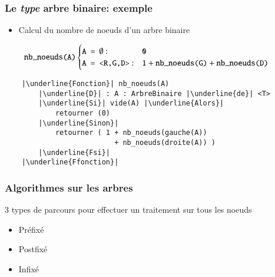 \documentclass[table,handout,tikz,12pt,svgnames]{beamer}
\begin{document}
\begin{frame}[fragile=singleslide]
	\frametitle{Le \textit{type} arbre binaire: exemple}
	\begin{block}{} %
		\begin{itemize}
			\item Calcul du nombre de noeuds d'un arbre binaire
		\end{itemize}
	\end{block}

	\begin{block}{}%
		\vspace{-1.5em}
		\small
		\[
		\hspace{-0.5cm}
		\texttt{nb\_noeuds(A)}
		\begin{cases}
		\texttt{A = $\emptyset$}: & \texttt{0}\\
		\texttt{A = <R,G,D>}: & \texttt{1} + \texttt{nb\_noeuds(G)} + \texttt{nb\_noeuds(D)}

		\end{cases}
		\]
		\vspace{-1em}
	\end{block}

	\begin{block}{}
		\begin{verbatim}
	|\underline{Fonction}| nb_noeuds(A)
		|\underline{D}| : A : ArbreBinaire |\underline{de}| <T>
		|\underline{Si}| vide(A) |\underline{Alors}|
			retourner (0)
		|\underline{Sinon}|
			retourner ( 1 + nb_noeuds(gauche(A))
						  + nb_noeuds(droite(A)) )
		|\underline{Fsi}|
	|\underline{Ffonction}|
		\end{verbatim}
	\end{block}
\end{frame}


\begin{frame}[fragile=singleslide]
	\frametitle{Algorithmes sur les arbres}
	\begin{block}{3 types de parcours pour effectuer un traitement sur tous les noeuds}
		\begin{itemize}
			\item Préfixé
			\item Postfixé
			\item Infixé
		\end{itemize}
	\end{block}
\end{frame}
\end{document}
